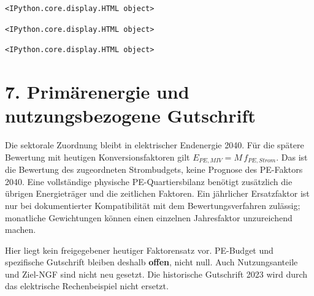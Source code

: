 \documentclass[
  ngerman,
  a4paper,
  DIV=11]{scrreprt}
\begin{document}
\begin{verbatim}
<IPython.core.display.HTML object>
\end{verbatim}

\begin{verbatim}
<IPython.core.display.HTML object>
\end{verbatim}

\begin{verbatim}
<IPython.core.display.HTML object>
\end{verbatim}

\section{7. Primärenergie und nutzungsbezogene
Gutschrift}\label{primuxe4renergie-und-nutzungsbezogene-gutschrift}

Die sektorale Zuordnung bleibt in elektrischer Endenergie 2040. Für die
spätere Bewertung mit heutigen Konversionsfaktoren gilt
\(E_{PE,MIV}=M\,f_{PE,Strom}\). Das ist die Bewertung des zugeordneten
Strombudgets, keine Prognose des PE-Faktors 2040. Eine vollständige
physische PE-Quartiersbilanz benötigt zusätzlich die übrigen
Energieträger und die zeitlichen Faktoren. Ein jährlicher Ersatzfaktor
ist nur bei dokumentierter Kompatibilität mit dem Bewertungsverfahren
zulässig; monatliche Gewichtungen können einen einzelnen Jahresfaktor
unzureichend machen.

Hier liegt kein freigegebener heutiger Faktorensatz vor. PE-Budget und
spezifische Gutschrift bleiben deshalb \textbf{offen}, nicht null. Auch
Nutzungsanteile und Ziel-NGF sind nicht neu gesetzt. Die historische
Gutschrift 2023 wird durch das elektrische Rechenbeispiel nicht ersetzt.
\end{document}
